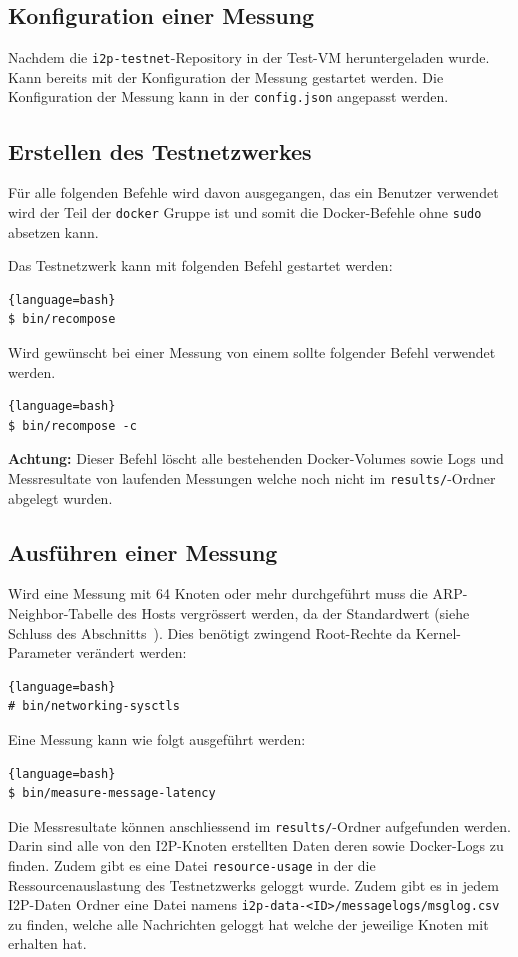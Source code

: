 \subsection{Konfiguration einer Messung}

Nachdem die \lstinline|i2p-testnet|-Repository in der Test-VM heruntergeladen wurde. Kann bereits mit der Konfiguration der Messung gestartet werden.
Die Konfiguration der Messung kann in der \lstinline|config.json| angepasst werden.

\subsection{Erstellen des Testnetzwerkes}

Für alle folgenden Befehle wird davon ausgegangen, das ein Benutzer verwendet wird der Teil der \lstinline|docker| Gruppe ist und somit die Docker-Befehle ohne \lstinline|sudo| absetzen kann.

Das Testnetzwerk kann mit folgenden Befehl gestartet werden:

\begin{lstlisting}{language=bash}
$ bin/recompose
\end{lstlisting}

Wird gewünscht bei einer Messung von einem  sollte folgender Befehl verwendet werden.

\begin{lstlisting}{language=bash}
$ bin/recompose -c
\end{lstlisting}

\textbf{Achtung:} Dieser Befehl löscht alle bestehenden Docker-Volumes sowie Logs und Messresultate von laufenden Messungen welche noch nicht im \lstinline|results/|-Ordner abgelegt wurden.

\subsection{Ausführen einer Messung}

Wird eine Messung mit 64 Knoten oder mehr durchgeführt muss die ARP-Neighbor-Tabelle des Hosts vergrössert werden, da der Standardwert  (siehe Schluss des Abschnitts~). Dies benötigt zwingend Root-Rechte da Kernel-Parameter verändert werden:

\begin{lstlisting}{language=bash}
# bin/networking-sysctls
\end{lstlisting}

Eine Messung kann wie folgt ausgeführt werden:

\begin{lstlisting}{language=bash}
$ bin/measure-message-latency
\end{lstlisting}

Die Messresultate können anschliessend im \lstinline|results/|-Ordner aufgefunden werden. Darin sind alle von den I2P-Knoten erstellten Daten deren sowie Docker-Logs zu finden. Zudem gibt es eine Datei \lstinline|resource-usage| in der die Ressourcenauslastung des Testnetzwerks geloggt wurde. Zudem gibt es in jedem I2P-Daten Ordner eine Datei namens \lstinline|i2p-data-<ID>/messagelogs/msglog.csv| zu finden, welche alle Nachrichten geloggt hat welche der jeweilige Knoten mit erhalten hat.
